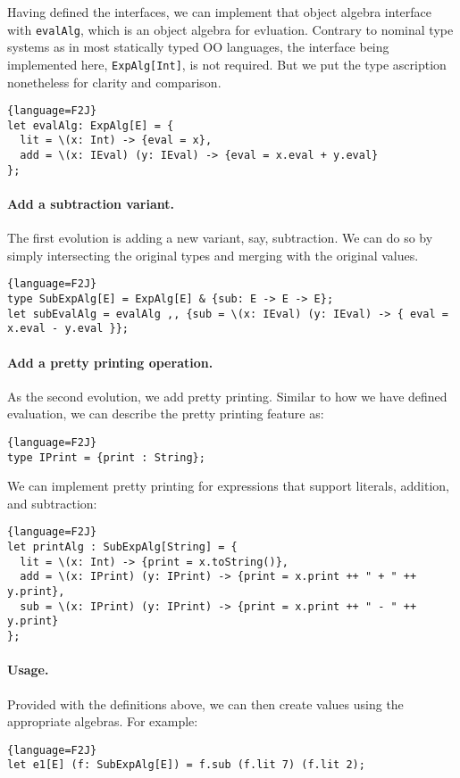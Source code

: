 Having defined the interfaces, we can implement that object algebra interface
with \lstinline$evalAlg$, which is an object algebra for evluation. Contrary to
nominal type systems as in most statically typed OO languages, the interface
being implemented here, \lstinline$ExpAlg[Int]$, is not required. But we put the
type ascription nonetheless for clarity and comparison.
\begin{lstlisting}{language=F2J}
let evalAlg: ExpAlg[E] = {
  lit = \(x: Int) -> {eval = x},
  add = \(x: IEval) (y: IEval) -> {eval = x.eval + y.eval}
};
\end{lstlisting}

\paragraph{Add a subtraction variant.}
The first evolution is adding a new variant, say, subtraction. We can do so by
simply intersecting the original types and merging with the original values.
\begin{lstlisting}{language=F2J}
type SubExpAlg[E] = ExpAlg[E] & {sub: E -> E -> E};
let subEvalAlg = evalAlg ,, {sub = \(x: IEval) (y: IEval) -> { eval = x.eval - y.eval }};
\end{lstlisting}

\paragraph{Add a pretty printing operation.}
As the second evolution, we add pretty printing. Similar to how we have defined
evaluation, we can describe the pretty printing feature as:
\begin{lstlisting}{language=F2J}
type IPrint = {print : String};
\end{lstlisting}
We can implement pretty printing for expressions that support literals,
addition, and subtraction:
\begin{lstlisting}{language=F2J}
let printAlg : SubExpAlg[String] = {
  lit = \(x: Int) -> {print = x.toString()},
  add = \(x: IPrint) (y: IPrint) -> {print = x.print ++ " + " ++ y.print},
  sub = \(x: IPrint) (y: IPrint) -> {print = x.print ++ " - " ++ y.print}
};
\end{lstlisting}

\paragraph{Usage.}
Provided with the definitions above, we can then create values using the
appropriate algebras. For example:
\begin{lstlisting}{language=F2J}
let e1[E] (f: SubExpAlg[E]) = f.sub (f.lit 7) (f.lit 2);
\end{lstlisting}

